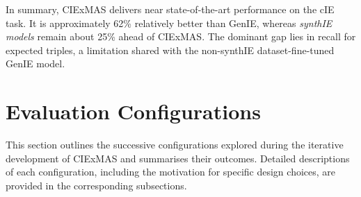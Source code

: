 \documentclass[a4paper,oneside,bibliography=totoc]{scrbook}
\begin{document}
In summary, CIExMAS delivers near state-of-the-art performance on the \ac{cIE} task. It is approximately 62\% relatively better than GenIE, whereas \textit{synthIE models} remain about 25\% ahead of CIExMAS. The dominant gap lies in recall for expected triples, a limitation shared with the non-synthIE dataset-fine-tuned GenIE model.

\section{Evaluation Configurations}
\label{sec:evaluation_configurations}

This section outlines the successive configurations explored during the iterative development of CIExMAS and summarises their outcomes. Detailed descriptions of each configuration, including the motivation for specific design choices, are provided in the corresponding subsections.
\end{document}
